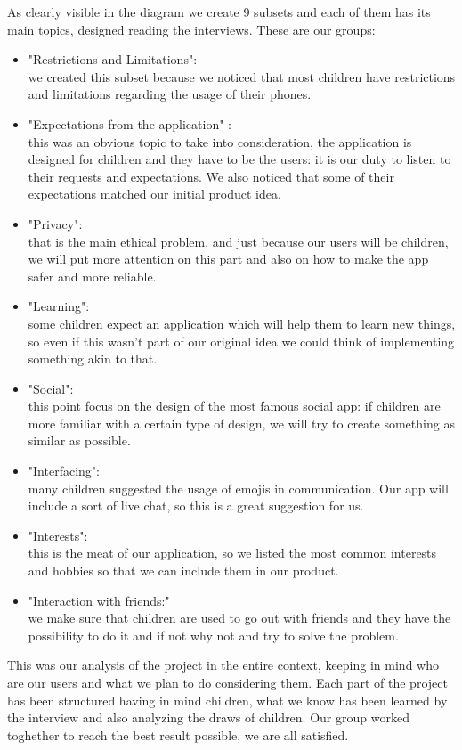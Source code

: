 \documentclass[12pt]{report}
\begin{document}
  As clearly visible in the diagram we create 9 subsets and each of them has its
  main topics, designed reading the interviews. These are our groups:
	\begin{itemize}
		\item "Restrictions and Limitations":\\
		       we created this subset because we noticed that most children have
					 restrictions and limitations regarding the usage of their phones.
		\item "Expectations from the application" :\\
		       this was an obvious topic to take into consideration, the application is designed
					 for children and they have to be the users: it is our duty to listen to their requests and expectations. 
					 We also noticed that some of their expectations matched our initial product idea.
		\item "Privacy":\\
		       that is the main ethical problem, and just because our users will be children,
					 we will put more attention on this part and also on how to make the app safer and more reliable.
		\item "Learning":\\
		       some children expect an application which will help them to learn new things, so even if this wasn't
					 part of our original idea we could think of implementing something akin to that.
		\item "Social":\\
		       this point focus on the design of the most famous social app: if children are more familiar
					 with a certain type of design, we will try to create something as similar as possible.
		\item "Interfacing":\\
		       many children suggested the usage of emojis in communication. Our app will include a sort
					 of live chat, so this is a great suggestion for us.
		\item "Interests":\\
		       this is the meat of our application, so we listed the most common interests and hobbies
					 so that we can include them in our product.
		\item "Interaction with friends:"\\
		       we make sure that children are used to go out with friends and they have the possibility to do
					 it and if not why not and try to solve the problem.

	\end{itemize}

	 This was our analysis of the project in the entire context, keeping in mind who are our users and what we
	 plan to do considering them. Each part of the project has been structured having in mind children, what we
	 know has been learned by the interview and also analyzing the draws of children. Our group worked toghether
	 to reach the best result possible, we are all satisfied.














	
\end{document}
